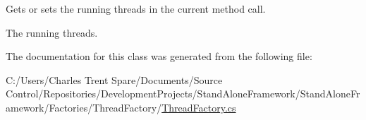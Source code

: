 Gets or sets the running threads in the current method call. 

The running threads.

The documentation for this class was generated from the following file\+:\begin{DoxyCompactItemize}
\item 
C\+:/\+Users/\+Charles Trent Spare/\+Documents/\+Source Control/\+Repositories/\+Development\+Projects/\+Stand\+Alone\+Framework/\+Stand\+Alone\+Framework/\+Factories/\+Thread\+Factory/\hyperlink{_thread_factory_8cs}{Thread\+Factory.\+cs}\end{DoxyCompactItemize}
